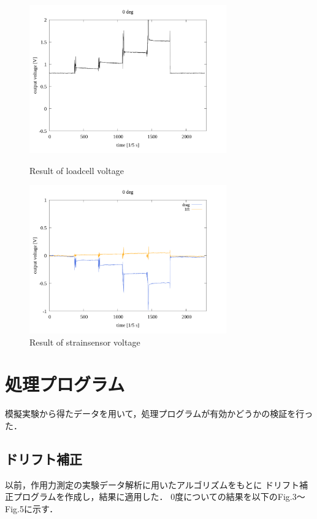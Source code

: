 \documentclass[twocolumn,a4j]{jsarticle}
\begin{document}
\begin{figure}[htbp]
    \footnotesize
    \begin{center}
        \includegraphics[width=85mm]{../images/voltage-time/0_loadcell.png}
        \caption{Result of loadcell voltage}
        \includegraphics[width=85mm]{../images/voltage-time/0_strainsensor.png}
        \caption{Result of strainsensor voltage}
    \end{center}
\end{figure}

\section{処理プログラム}
模擬実験から得たデータを用いて，処理プログラムが有効かどうかの検証を行った．

\subsection{ドリフト補正}
以前，作用力測定の実験データ解析に用いたアルゴリズムをもとに
ドリフト補正プログラムを作成し，結果に適用した．
0度についての結果を以下のFig.3～Fig.5に示す．
\end{document}
